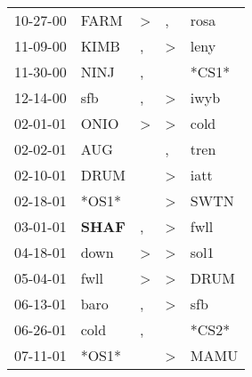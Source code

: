 \begin{supertabular}{p{0.07\textwidth}p{0.06\textwidth}p{0.02\textwidth}p{0.02\textwidth}p{0.06\textwidth}}
          10-27-00\textsuperscript{} &           FARM\textsuperscript{} &     \textgreater &                , &           rosa\textsuperscript{} \\
          11-09-00\textsuperscript{} &           KIMB\textsuperscript{} &                , &     \textgreater &           leny\textsuperscript{} \\
          11-30-00\textsuperscript{} &           NINJ\textsuperscript{} &                , &                  &                            *CS1* \\
          12-14-00\textsuperscript{} &            sfb\textsuperscript{} &                , &     \textgreater &           iwyb\textsuperscript{} \\
          02-01-01\textsuperscript{} &           ONIO\textsuperscript{} &     \textgreater &     \textgreater &           cold\textsuperscript{} \\
          02-02-01\textsuperscript{} &            AUG\textsuperscript{} &                  &                , &           tren\textsuperscript{} \\
          02-10-01\textsuperscript{} &           DRUM\textsuperscript{} &                  &     \textgreater &           iatt\textsuperscript{} \\
          02-18-01\textsuperscript{} &                            *OS1* &                  &     \textgreater &           SWTN\textsuperscript{} \\
          03-01-01\textsuperscript{} &  \textbf{SHAF\textsuperscript{}} &                , &     \textgreater &           fwll\textsuperscript{} \\
          04-18-01\textsuperscript{} &           down\textsuperscript{} &     \textgreater &     \textgreater &           sol1\textsuperscript{} \\
          05-04-01\textsuperscript{} &           fwll\textsuperscript{} &     \textgreater &     \textgreater &           DRUM\textsuperscript{} \\
          06-13-01\textsuperscript{} &           baro\textsuperscript{} &                , &     \textgreater &            sfb\textsuperscript{} \\
          06-26-01\textsuperscript{} &           cold\textsuperscript{} &                , &                  &                            *CS2* \\
          07-11-01\textsuperscript{} &                            *OS1* &                  &     \textgreater &           MAMU\textsuperscript{} \\

\end{supertabular}
